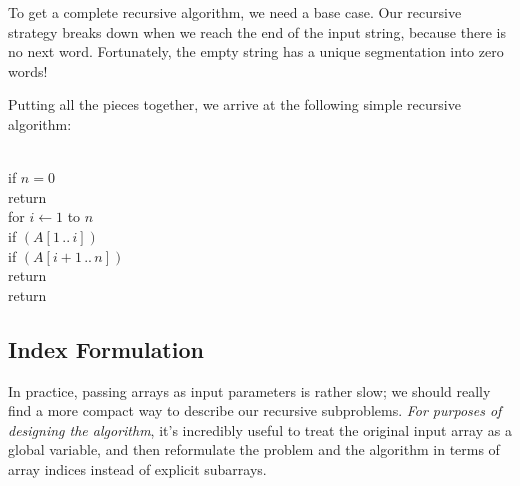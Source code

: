 To get a complete recursive algorithm, we need a base case.
Our recursive strategy breaks down when we reach the end of the input string, because there is no next word.
Fortunately, the empty string has a unique segmentation into zero words!

Putting all the pieces together, we arrive at the following simple recursive algorithm:

\begin{pseudocode}
\\
if $n = 0$\\
\Indent return \\
for $i \gets 1$ to $n$\\
\Indent if $(A[1\,..\,i])$\\
\Indent\Indent if $(A[i+1\,..\,n])$\\
\Indent\Indent\Indent return \\
return 
\end{pseudocode}

\subsection{Index Formulation}

In practice, passing arrays as input parameters is rather slow; we should really find a more compact way to describe our recursive subproblems.
\textit{For purposes of designing the algorithm}, it’s incredibly useful to treat the original input array as a global variable, and then reformulate the problem and the algorithm in terms of array indices instead of explicit subarrays.

